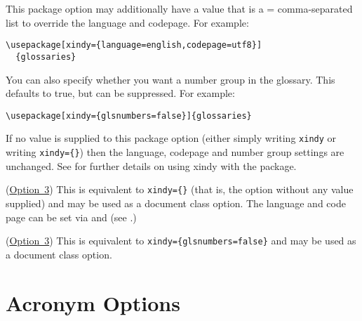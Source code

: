 \documentclass[report,inlinetitle]{nlctdoc}
\newcommand*{\opt}[1]{\hyperlink{option#1}{Option~#1}}
\begin{document}
\begin{description}
This package option may additionally have a value that
is a = comma-separated list to override the
language and codepage. For example:
\begin{verbatim}
\usepackage[xindy={language=english,codepage=utf8}]
  {glossaries}
\end{verbatim}
You can also specify whether you want a number group in the
glossary. This defaults to true, but can be suppressed. For example:
\begin{verbatim}
\usepackage[xindy={glsnumbers=false}]{glossaries}
\end{verbatim}
If no value is supplied to this package option (either simply
writing \texttt{xindy} or writing \verb|xindy={}|) then the
language, codepage and number group settings are unchanged.  See
 for further details on using \gls{xindy} with
the  package.

\item[\pkgopt{xindygloss}]  (\opt3) This is equivalent to
\verb|xindy={}| (that is, the  option without any value
supplied) and may be used as a document class option. The language
and code page can be set via  and
 (see .)

\item[\pkgopt{xindynoglsnumbers}] (\opt3) This is equivalent to
\verb|xindy={glsnumbers=false}| and may be used as a document class
option.

\end{description}

\section{Acronym Options}
\label{sec:pkgopts-acronym}
\end{document}

